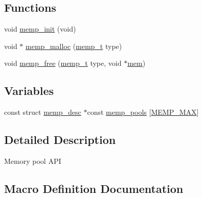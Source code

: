 \subsection*{Functions}
\begin{DoxyCompactItemize}
\item 
void \hyperlink{openmote-cc2538_2lwip_2src_2include_2lwip_2memp_8h_a9693e5b1ac2c6b9c0e7870522d45efa2}{memp\+\_\+init} (void)
\item 
void $\ast$ \hyperlink{openmote-cc2538_2lwip_2src_2include_2lwip_2memp_8h_a2b00593d086313c267b54a976bf67aa5}{memp\+\_\+malloc} (\hyperlink{native_2lwip_2src_2include_2lwip_2memp_8h_a85a164b1f7764951cc685ea525114e57}{memp\+\_\+t} type)
\item 
void \hyperlink{openmote-cc2538_2lwip_2src_2include_2lwip_2memp_8h_aecd94926b7c2a0e23ae195f4ae97581f}{memp\+\_\+free} (\hyperlink{native_2lwip_2src_2include_2lwip_2memp_8h_a85a164b1f7764951cc685ea525114e57}{memp\+\_\+t} type, void $\ast$\hyperlink{structmem}{mem})
\end{DoxyCompactItemize}
\subsection*{Variables}
\begin{DoxyCompactItemize}
\item 
const struct \hyperlink{structmemp__desc}{memp\+\_\+desc} $\ast$const \hyperlink{openmote-cc2538_2lwip_2src_2include_2lwip_2memp_8h_ad78a1f656a766f2c6341aa466762b883}{memp\+\_\+pools} \mbox{[}\hyperlink{openmote-cc2538_2lwip_2src_2include_2lwip_2memp_8h_a85a164b1f7764951cc685ea525114e57a3387042084427642949f3223c7ddd321}{M\+E\+M\+P\+\_\+\+M\+AX}\mbox{]}
\end{DoxyCompactItemize}


\subsection{Detailed Description}
Memory pool A\+PI 

\subsection{Macro Definition Documentation}
\mbox{\label{openmote-cc2538_2lwip_2src_2include_2lwip_2memp_8h_a5f75b6e9cf0c6df9e70b08b8e05a1835}} 
